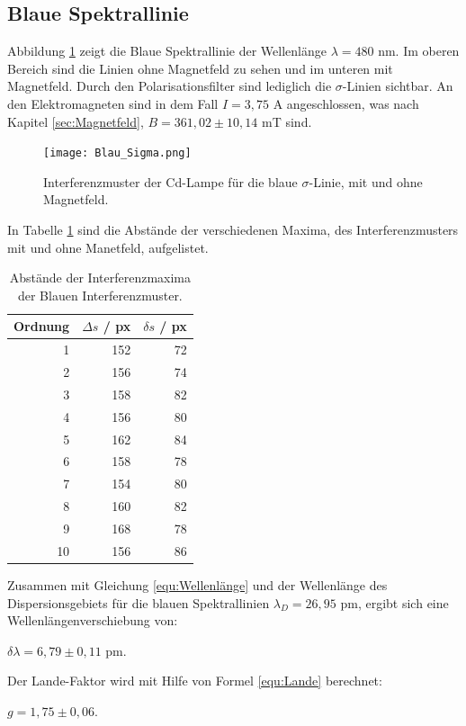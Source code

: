 \subsection{Blaue Spektrallinie}
Abbildung \ref{fig:BlauS} zeigt die Blaue Spektrallinie der Wellenlänge $\lambda = 480$ nm. 
Im oberen Bereich sind die Linien ohne Magnetfeld zu sehen und im unteren mit Magnetfeld. Durch den Polarisationsfilter sind lediglich die $\sigma$-Linien sichtbar.
An den Elektromagneten sind in dem Fall $I = 3,75$ A angeschlossen, was nach Kapitel \ref{sec:Magnetfeld}, $B = 361,02 \pm 10,14$ mT sind.

\begin{figure}[H]
  \centering
  \texttt{[image: Blau\_Sigma.png]}
  \vspace{-10pt}
  \caption{Interferenzmuster der Cd-Lampe für die blaue $\sigma$-Linie, mit und ohne Magnetfeld.}
  \label{fig:BlauS}
\end{figure}

In Tabelle \ref{tab:BlauS} sind die Abstände der verschiedenen Maxima, des Interferenzmusters mit und ohne Manetfeld, aufgelistet.

\begin{table}
  \centering
  \footnotesize
  \caption{Abstände der Interferenzmaxima der Blauen Interferenzmuster.}
  \label{tab:BlauS}

  \begin{tabular}{r r r}
    \toprule
    Ordnung & $\Delta s$ / px & $\delta s$ / px\\
    \midrule
    1   & 152 & 72 \\
    2   & 156 & 74 \\
    3   & 158 & 82 \\
    4   & 156 & 80 \\
    5   & 162 & 84 \\
    6   & 158 & 78 \\
    7   & 154 & 80 \\
    8   & 160 & 82 \\
    9   & 168 & 78 \\
    10  & 156 & 86 \\
    \bottomrule
  \end{tabular}
\end{table}

Zusammen mit Gleichung \eqref{equ:Wellenlänge} und der Wellenlänge des Dispersionsgebiets für die blauen Spektrallinien $\lambda_D = 26,95$ pm, ergibt sich 
eine Wellenlängenverschiebung von: \\
\begin{center}
$\delta \lambda = 6,79 \pm 0,11$ pm.\\
\end{center}
Der Lande-Faktor wird mit Hilfe von Formel \eqref{equ:Lande} berechnet:\\
\begin{center}
$g = 1,75 \pm 0,06$.
\end{center}



